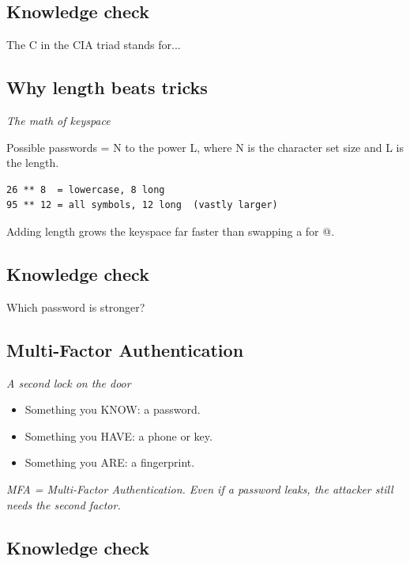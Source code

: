 \documentclass[12pt,openany]{book}
\begin{document}
\medskip

\subsection*{Knowledge check}

The C in the CIA triad stands for...

\medskip

\subsection*{Why length beats tricks}
{\small\itshape\color{gray}The math of keyspace}


Possible passwords = N to the power L, where N is the character set size and L is the length.

\begin{lstlisting}
26 ** 8  = lowercase, 8 long
95 ** 12 = all symbols, 12 long  (vastly larger)\end{lstlisting}

Adding length grows the keyspace far faster than swapping a for @.

\medskip

\subsection*{Knowledge check}

Which password is stronger?

\medskip

\subsection*{Multi-Factor Authentication}
{\small\itshape\color{gray}A second lock on the door}


\begin{itemize}
  \item Something you KNOW: a password.
  \item Something you HAVE: a phone or key.
  \item Something you ARE: a fingerprint.
\end{itemize}
{\small\itshape\color{gray}MFA = Multi-Factor Authentication. Even if a password leaks, the attacker still needs the second factor.}

\medskip

\subsection*{Knowledge check}
\end{document}
